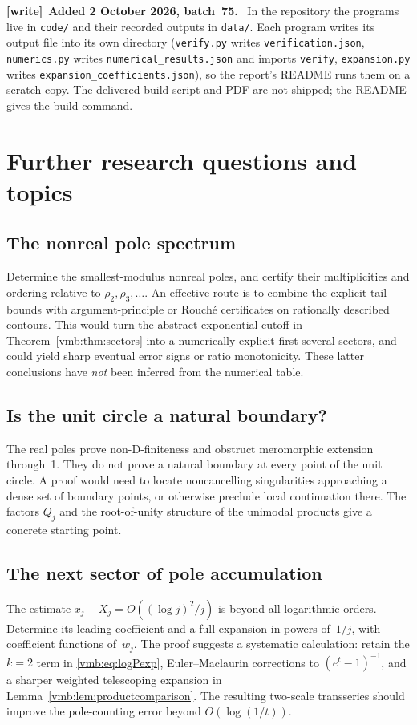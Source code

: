 \documentclass[11pt,a4paper]{article}
\numberwithin{equation}{section}
\theoremstyle{definition}\newtheorem{definition}[theorem]{Definition}
\theoremstyle{remark}\newtheorem{remark}[theorem]{Remark}
\newenvironment{writenote}[1][]{\par\smallskip\begingroup\small
 \noindent\textbf{[write]}\if\relax\detokenize{#1}\relax\else~\textbf{#1.}\fi\ }%
 {\par\endgroup\smallskip}
\begin{document}
\begin{writenote}[Added 2 October 2026, batch~75]
In the repository the programs live in \texttt{code/} and their recorded
outputs in \texttt{data/}. Each program writes its output file into its own
directory (\texttt{verify.py} writes \texttt{verification.json},
\texttt{numerics.py} writes \texttt{numerical\_results.json} and imports
\texttt{verify}, \texttt{expansion.py} writes
\texttt{expansion\_coefficients.json}), so the report's README runs them on
a scratch copy. The delivered build script and PDF are not shipped; the
README gives the build command.
\end{writenote}

\section{Further research questions and topics}\label{vmb:sec:future}

\subsection{The nonreal pole spectrum}
Determine the smallest-modulus nonreal poles, and certify their
multiplicities and ordering relative to \(\rho_2,\rho_3,\ldots\).
An effective route is to combine the explicit tail bounds with
argument-principle or Rouch\'e certificates on rationally described
contours. This would turn the abstract exponential cutoff in
Theorem~\ref{vmb:thm:sectors} into a numerically explicit first several
sectors, and could yield sharp eventual error signs or ratio
monotonicity. These latter conclusions have \emph{not} been inferred
from the numerical table.

\subsection{Is the unit circle a natural boundary?}
The real poles prove non-D-finiteness and obstruct meromorphic extension
through~1. They do not prove a natural boundary at every point of the
unit circle. A proof would need to locate noncancelling singularities
approaching a dense set of boundary points, or otherwise preclude local
continuation there. The factors \(Q_j\) and the root-of-unity structure
of the unimodal products give a concrete starting point.

\subsection{The next sector of pole accumulation}
The estimate \(x_j-X_j=O((\log j)^2/j)\) is beyond all logarithmic
orders. Determine its leading coefficient and a full expansion in
powers of~\(1/j\), with coefficient functions of~\(w_j\).
The proof suggests a systematic calculation: retain the \(k=2\) term
in \eqref{vmb:eq:logPexp}, Euler--Maclaurin corrections to
\((e^t-1)^{-1}\), and a sharper weighted telescoping expansion in
Lemma~\ref{vmb:lem:productcomparison}. The resulting two-scale transseries
should improve the pole-counting error beyond
\(O(\log(1/t))\).
\end{document}
